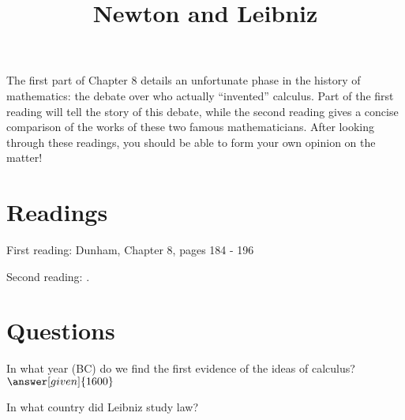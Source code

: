 \documentclass[nooutcomes]{ximera}
\title{Newton and Leibniz}
\begin{document}
\begin{abstract}
    
\end{abstract}
\maketitle

The first part of Chapter 8 details an unfortunate phase in the history of mathematics: the debate over who actually ``invented'' calculus.  Part of the first reading will tell the story of this debate, while the second reading gives a concise comparison of the works of these two famous mathematicians.  After looking through these readings, you should be able to form your own opinion on the matter!




\section{Readings}
First reading: Dunham, Chapter 8, pages 184 - 196

Second reading: .



\section{Questions}

\begin{question}
In what year (BC) do we find the first evidence of the ideas of calculus?
$\answer[given]{1600}$
\end{question}

\begin{question}
In what country did Leibniz study law?
\begin{multipleChoice}
\end{multipleChoice}
\end{question}


%
\end{document}
